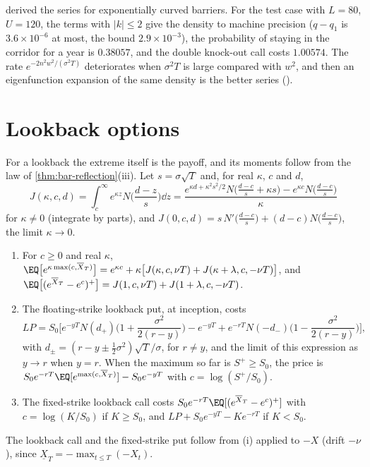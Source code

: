 \textcite{kunitomo-ikeda-1992} derived the series for exponentially curved barriers. For the test
case with $L=80$, $U=120$, the terms with $|k|\le2$ give the density to machine precision
($q-q_1$ is $3.6\times10^{-6}$ at most, the bound $2.9\times10^{-3}$), the probability of
staying in the corridor for a year is $0.38057$, and the double knock-out call costs $1.00574$.
The rate $e^{-2n^2w^2/(\sigma^2T)}$ deteriorates when $\sigma^2T$ is large compared with $w^2$, and
then an eigenfunction expansion of the same density is the better series ().


\section{Lookback options}\label{sec:bar-lookback}

For a lookback the extreme itself is the payoff, and its moments follow from the law of
\cref{thm:bar-reflection}(iii). Let $s=\sigma\sqrt T$ and, for real $\kappa$, $c$ and $d$,
\[
  J(\kappa,c,d)=\int_c^\infty e^{\kappa z}N\Big(\frac{d-z}s\Big)\dd z
  =\frac{e^{\kappa d+\kappa^2s^2/2}N\big(\frac{d-c}s+\kappa s\big)-e^{\kappa c}N\big(\frac{d-c}s\big)}{\kappa}
\]
for $\kappa\ne0$ (integrate by parts), and $J(0,c,d)=s\,N'\big(\frac{d-c}s\big)+(d-c)N\big(\frac{d-c}s\big)$,
the limit $\kappa\to0$.

\begin{proposition}\label{prop:bar-lookback}
\begin{enumerate}[label=(\roman*)]
  \item For $c\ge0$ and real $\kappa$,
    $\EQ\big[e^{\kappa\max(c,\overline X_T)}\big]=e^{\kappa c}+\kappa\big[J(\kappa,c,\nu T)+J(\kappa+\lambda,c,-\nu T)\big]$,
    and $\EQ\big[(e^{\overline X_T}-e^c)^+\big]=J(1,c,\nu T)+J(1+\lambda,c,-\nu T)$.
  \item The floating-strike lookback put, at inception, costs
    \[
      LP=S_0\Big[e^{-yT}N(d_+)\Big(1+\frac{\sigma^2}{2(r-y)}\Big)-e^{-yT}
      +e^{-rT}N(-d_-)\Big(1-\frac{\sigma^2}{2(r-y)}\Big)\Big],
    \]
    with $d_\pm=(r-y\pm\frac12\sigma^2)\sqrt T/\sigma$,
    for $r\ne y$, and the limit of this expression as $y\to r$ when $y=r$. When the maximum so far
    is $S^+\ge S_0$, the price is $S_0e^{-rT}\EQ[e^{\max(c,\overline X_T)}]-S_0e^{-yT}$ with $c=\log(S^+/S_0)$.
  \item The fixed-strike lookback call costs $S_0e^{-rT}\EQ[(e^{\overline X_T}-e^{c})^+]$ with
    $c=\log(K/S_0)$ if $K\ge S_0$, and $LP+S_0e^{-yT}-Ke^{-rT}$ if $K<S_0$.
  \end{enumerate}
The lookback call and the fixed-strike put follow from (i) applied to $-X$ (drift $-\nu$), since
$\underline X_T=-\max_{t\le T}(-X_t)$.
\end{proposition}


